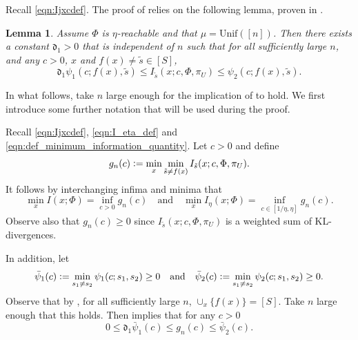 \documentclass[11pt]{article}
\newcommand{\eqdef}{\vcentcolon=}
\newcommand{\mf}[1]{\mathfrak{#1}}
\newtheorem{lemma}[theorem]{Lemma}
\theoremstyle{definition}
\theoremstyle{definition}
\begin{document}
Recall \eqref{eqn:Ijxcdef}.
The proof of  relies on the following lemma, proven in .
\begin{lemma}
	\label{lem:information_quantity_bounds}
	Assume $\Phi$ is $\eta$-reachable and that $\mu=\mathrm{Unif}([n])$.
	Then there exists a constant $\mf{d}_1>0$ that is independent of $n$ such that for all sufficiently large $n$, and any $c>0$, $x$ and $f(x)\neq \tilde{s}\in[S]$,
	\begin{equation}
		\label{eqn:information_quantity_bounds}
		\mf{d}_1\psi_1(c;f(x),\tilde{s})\leq I_{\tilde{s}}(x;c,\Phi,\pi_U)\leq \psi_2(c;f(x),\tilde{s}).
	\end{equation}
\end{lemma}

In what follows, take $n$ large enough for the implication of  to hold.
We first introduce some further notation that will be used during the proof.

Recall \eqref{eqn:Ijxcdef}, \eqref{eqn:I_eta_def} and \eqref{eqn:def_minimum_information_quantity}.
Let $c>0$ and define
\begin{equation}
	g_n(c)
	\eqdef
	\min_{x}\min_{\tilde{s}\neq f(x)}I_{\tilde{s}}(x;c,\Phi,\pi_U)
	.
\end{equation}
It follows by interchanging infima and minima that
\begin{equation}
	\min_{x}
	I(x;\Phi)
	=
	\inf_{c>0}
	g_n(c)
	\quad
	\mathrm{and}
	\quad
	\min_{x}
	I_{\eta}(x;\Phi)
	=
	\inf_{c\in[1/\eta,\eta]}
	g_n(c)
	.
\end{equation}
Observe also that $g_n(c)\geq 0$ since $I_{\tilde{s}}(x;c,\Phi,\pi_U)$ is a weighted sum of KL-divergences.

In addition, let
\begin{equation}
	\label{eqn:bar_psi_definition}
	\bar{\psi}_1(c)
	\eqdef
	\min_{s_1\neq s_2}
	\psi_1(c;s_1,s_2)
	\geq
	0
	\quad
	\mathrm{and}
	\quad
	\bar{\psi}_2(c)
	\eqdef
	\min_{s_1\neq s_2}
	\psi_2(c;s_1,s_2)
	\geq
	0
	.
\end{equation}
Observe that by , for all sufficiently large $n$, $\cup_{x}\{f(x)\}=[S]$.
Take $n$ large enough that this holds.
Then  implies that for any $c>0$
\begin{equation}
	\label{eqn:implication_of_information_quantity_bounds}
	0
	\leq
	\mf{d}_1\bar{\psi}_1(c)
	\leq
	g_n(c)
	\leq
	\bar{\psi}_2(c)
	.
\end{equation}
\end{document}
